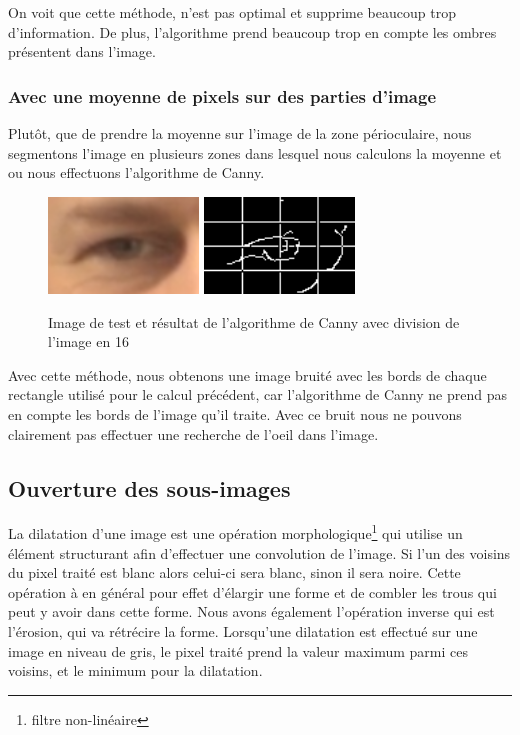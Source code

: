 On voit que cette méthode, n'est pas optimal et supprime beaucoup trop d'information. De plus,
l'algorithme prend beaucoup trop en compte les ombres présentent dans l'image.

\subsubsection{Avec une moyenne de pixels sur des parties d'image}

Plutôt, que de prendre la moyenne sur l'image de la zone périoculaire, nous segmentons l'image
en plusieurs zones dans lesquel nous calculons la moyenne et ou nous effectuons l'algorithme
de Canny.

\begin{figure}[H]
 \center
 \includegraphics[width=4cm]{image/original.png}
 \includegraphics[width=4cm]{image/canny_decomposition.png}
 \caption{Image de test et résultat de l'algorithme de Canny avec division de l'image en 16}
\end{figure}

Avec cette méthode, nous obtenons une image bruité avec les bords de chaque rectangle utilisé
pour le calcul précédent, car l'algorithme de Canny ne prend pas en compte les bords de l'image
qu'il traite. Avec ce bruit nous ne pouvons clairement pas effectuer une recherche de l'oeil dans
l'image.

\subsection{Ouverture des sous-images}

La dilatation d'une image est une opération morphologique\footnote{filtre non-linéaire} qui utilise 
un élément structurant afin d'effectuer une convolution de l'image. Si l'un des voisins du pixel traité
est blanc alors celui-ci sera blanc, sinon il sera noire.
Cette opération à en général pour effet d'élargir une forme et de combler les trous qui peut y avoir
dans cette forme. Nous avons également l'opération inverse qui est l'érosion, qui va rétrécire la forme.
Lorsqu'une dilatation est effectué sur une image en niveau de gris, le pixel traité prend la valeur maximum parmi
ces voisins, et le minimum pour la dilatation.\\

